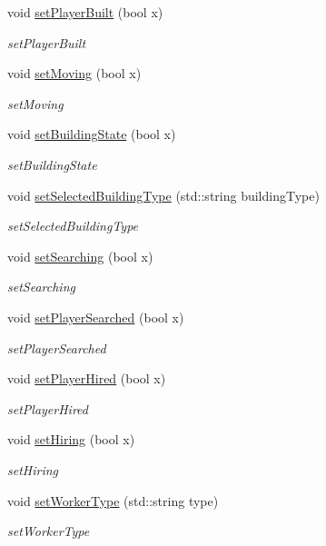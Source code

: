 \begin{DoxyCompactItemize}
void \hyperlink{class_game_1_1_game_event_handler_a99683723d5d65e7d21e5fa1a155d2186}{set\-Player\-Built} (bool x)
\begin{DoxyCompactList}\small\item\em set\-Player\-Built \end{DoxyCompactList}\item 
void \hyperlink{class_game_1_1_game_event_handler_a55e45f31053d73f476b8b4a791a0c0a0}{set\-Moving} (bool x)
\begin{DoxyCompactList}\small\item\em set\-Moving \end{DoxyCompactList}\item 
void \hyperlink{class_game_1_1_game_event_handler_a245850510b1043fd39beaa470b129421}{set\-Building\-State} (bool x)
\begin{DoxyCompactList}\small\item\em set\-Building\-State \end{DoxyCompactList}\item 
void \hyperlink{class_game_1_1_game_event_handler_a41926d8f979f3475d1917d4e6c467cdc}{set\-Selected\-Building\-Type} (std\-::string building\-Type)
\begin{DoxyCompactList}\small\item\em set\-Selected\-Building\-Type \end{DoxyCompactList}\item 
void \hyperlink{class_game_1_1_game_event_handler_a7a92ee4a45984a10990cc67fa25156b1}{set\-Searching} (bool x)
\begin{DoxyCompactList}\small\item\em set\-Searching \end{DoxyCompactList}\item 
void \hyperlink{class_game_1_1_game_event_handler_a70bd7161dcab377c9208d4d0ed098819}{set\-Player\-Searched} (bool x)
\begin{DoxyCompactList}\small\item\em set\-Player\-Searched \end{DoxyCompactList}\item 
void \hyperlink{class_game_1_1_game_event_handler_ac8c930bb1e2c019e2fc8bf83e46cfd9d}{set\-Player\-Hired} (bool x)
\begin{DoxyCompactList}\small\item\em set\-Player\-Hired \end{DoxyCompactList}\item 
void \hyperlink{class_game_1_1_game_event_handler_a71d75a9e789a8fbf1475ac3c932030bb}{set\-Hiring} (bool x)
\begin{DoxyCompactList}\small\item\em set\-Hiring \end{DoxyCompactList}\item 
void \hyperlink{class_game_1_1_game_event_handler_a57dbd2bd7edf4c42cf4a3d69e3eeaffe}{set\-Worker\-Type} (std\-::string type)
\begin{DoxyCompactList}\small\item\em set\-Worker\-Type \end{DoxyCompactList}\end{DoxyCompactItemize}


